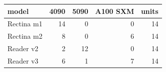 {\small\setlength{\tabcolsep}{4pt}
\noindent\begin{tabular}{@{}lrrrr@{}}
\hline
model & 4090 & 5090 & A100 SXM & units \\
\hline
Rectina m1 & 14 & 0 & 0 & 14 \\
Rectina m2 & 8 & 0 & 6 & 14 \\
Reader v2 & 2 & 12 & 0 & 14 \\
Reader v3 & 6 & 1 & 7 & 14 \\
\hline
\end{tabular}}
